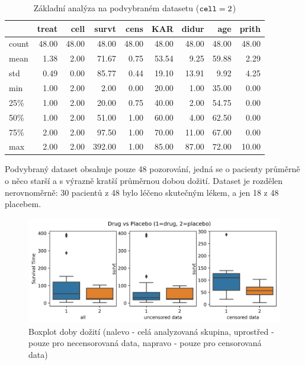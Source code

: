 \documentclass[a4, 11pt]{article}
\theoremstyle{definition}
\theoremstyle{remark}
\begin{document}
\begin{table}[H]
	\centering
	\label{tab:analyza_muj_dataset}
	\begin{tabular}{lrrrrrrrr}
		\toprule
		& treat & cell & survt & cens & KAR & didur & age & prith \\
		\midrule
		count & 48.00 & 48.00 & 48.00 & 48.00 & 48.00 & 48.00 & 48.00 & 48.00 \\
		mean & 1.38 & 2.00 & 71.67 & 0.75 & 53.54 & 9.25 & 59.88 & 2.29 \\
		std & 0.49 & 0.00 & 85.77 & 0.44 & 19.10 & 13.91 & 9.92 & 4.25 \\
		min & 1.00 & 2.00 & 2.00 & 0.00 & 20.00 & 1.00 & 35.00 & 0.00 \\
		25\% & 1.00 & 2.00 & 20.00 & 0.75 & 40.00 & 2.00 & 54.75 & 0.00 \\
		50\% & 1.00 & 2.00 & 51.00 & 1.00 & 60.00 & 4.00 & 62.50 & 0.00 \\
		75\% & 2.00 & 2.00 & 97.50 & 1.00 & 70.00 & 11.00 & 67.00 & 0.00 \\
		max & 2.00 & 2.00 & 392.00 & 1.00 & 85.00 & 87.00 & 72.00 & 10.00 \\
		\bottomrule
	\end{tabular}
	\caption{Základní analýza na podvybraném datasetu ($\mbox{\texttt{cell}}=2$)}
\end{table}
	
	Podvybraný dataset obsahuje pouze 48 pozorování, jedná se o pacienty průměrně o něco starší a s výrazně kratší průměrnou dobou dožití. Dataset je rozdělen nerovnoměrně: 30 pacientů z 48 bylo léčeno skutečným lékem, a jen 18 z 48 placebem. 
	
	\begin{figure}[H]
		\centering
		\includegraphics[width=0.999\linewidth]{img/boxplot_drug_vs_placebo_BOTH}
		\caption[Boxplot doby dožití]{Boxplot doby dožití (nalevo - celá analyzovaná skupina, uprostřed - pouze pro necensorovaná data, napravo - pouze pro censorovaná data)}
		\label{fig:boxplotdrugvsplacebo}
	\end{figure}
\end{document}

